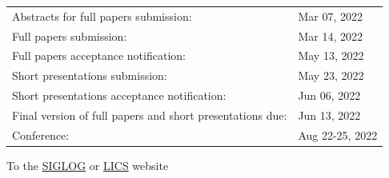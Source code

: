 \documentclass[prodmode,acmtecs]{acmsmall} %
\begin{document}
\begin{itemize}
\begin{tabulary}{\linewidth}{LL}Abstracts for full papers submission:  & Mar 07, 2022 \\
Full papers submission:  & Mar 14, 2022 \\
Full papers acceptance notification:  & May 13, 2022 \\
Short presentations submission:  & May 23, 2022 \\
Short presentations acceptance notification:  & Jun 06, 2022 \\
Final version of full papers and short presentations due:  & Jun 13, 2022 \\
Conference:  & Aug 22-25, 2022 \\
\end{tabulary}
 
\end{itemize}


To the \href{http://siglog.org/}{SIGLOG} or \href{https://lics.siglog.org}{LICS} website
\end{document}
